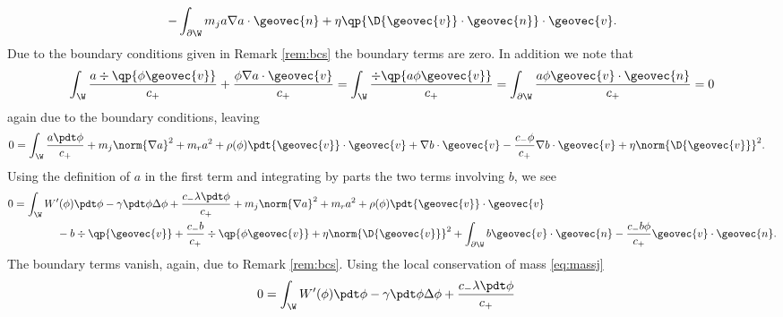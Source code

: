 \documentclass[final]{amsart}
\numberwithin{equation}{section}
\begin{document}
\begin{Proof}
\begin{equation}
\begin{split}
      - 
      \int_{\partial\W}
      m_j a\nabla a\cdot {\geovec{n}}
      +
      \eta \qp{\D {\geovec{v}} \cdot {\geovec{n}}}\cdot {\geovec{v}}.
    \end{split}
  \end{equation}
  Due to the boundary conditions given in Remark \ref{rem:bcs} the
  boundary terms are zero. In addition we note that
\begin{equation}
  \int_\W
  \frac{a\div\qp{\phi{\geovec{v}}}}{c_+}
  +
  \frac{\phi\nabla a \cdot {\geovec{v}}}{c_+}
  =
  \int_\W
  \frac{\div\qp{a\phi{\geovec{v}}}}{c_+}
  =
  \int_{\partial\W} 
  \frac{a\phi{\geovec{v}} \cdot {\geovec{n}}}{c_+}
  =
  0
\end{equation}
again due to the boundary conditions, leaving
\begin{equation}
  \begin{split}
    0
    &=
    \int_\W
    \frac{a\pdt \phi }
         {c_+}
    +
    m_j \norm{\nabla a}^2
    +
    m_r a^2
    +
    \rho(\phi)
    \pdt{{\geovec{v}}} \cdot {\geovec{v}}
    +
    \nabla b \cdot {\geovec{v}} 
    -
    \frac{c_- \phi}{c_+}
    \nabla b \cdot {\geovec{v}}
    +
    \eta \norm{\D {\geovec{v}}}^2     
    .
  \end{split}
\end{equation}
Using the definition of $a$ in the first term and integrating by parts
the two terms involving $b$, we see
\begin{equation}
  \begin{split}
    0
    &=
    \int_\W
    W'(\phi)\pdt \phi
    -
    \gamma 
    \pdt \phi
    \Delta \phi
    + 
    \frac{c_-\lambda\pdt \phi}{c_+}
    +
    m_j \norm{\nabla a}^2
    +
    m_r a^2
    +
    \rho(\phi)
    \pdt{{\geovec{v}}} \cdot {\geovec{v}}
    \\
    &\qquad\qquad 
    -
    b \div\qp{{\geovec{v}}}
    +
    \frac{c_- b}{c_+}
    \div\qp{ \phi{\geovec{v}} }
    +
    \eta \norm{\D {\geovec{v}}}^2     
    +
    \int_{\partial\W}
    b{\geovec{v}} \cdot {\geovec{n}}
    - 
    \frac{c_- b\phi}{c_+}
    {\geovec{v}} \cdot {\geovec{n}}
    .
  \end{split}  
\end{equation}
The boundary terms vanish, again, due to Remark \ref{rem:bcs}. Using
the local conservation of mass \eqref{eq:massj}
\begin{equation}
  \begin{split}
    0
    &=
    \int_\W
    W'(\phi)\pdt \phi
    -
    \gamma 
    \pdt \phi
    \Delta \phi
    + 
    \frac{c_-\lambda\pdt \phi}{c_+}

\end{split}
\end{equation}
\end{Proof}
\end{document}

